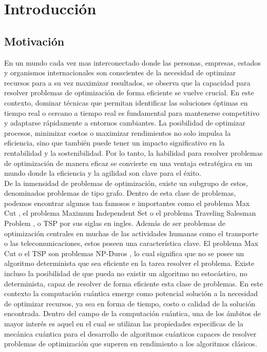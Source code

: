 \chapter{Introducción}

\section{Motivación}

En un mundo cada vez mas interconectado donde las personas, empresas, estados y organismos internacionales son conscientes de la necesidad de optimizar recursos para a su vez maximizar resultados, se observa que la capacidad para resolver problemas de optimización de forma eficiente se vuelve crucial. En este contexto, dominar técnicas que permitan identificar las soluciones óptimas en tiempo real o cercano a tiempo real es fundamental para mantenerse competitivo y adaptarse rápidamente a entornos cambiantes. La posibilidad de optimizar procesos, minimizar costos o maximizar rendimientos no solo impulsa la eficiencia, sino que también puede tener un impacto significativo en la rentabilidad y la sostenibilidad. Por lo tanto, la habilidad para resolver problemas de optimización de manera eficaz se convierte en una ventaja estratégica en un mundo donde la eficiencia y la agilidad son clave para el éxito. \\ 

De la inmensidad de problemas de optimización, existe un subgrupo de estos, denominados problemas de tipo grafo. Dentro de esta clase de problemas, podemos encontrar algunos tan famosos e importantes como el problema Max Cut \citep{yang}, el problema Maximum Independent Set \citep{heal} o el problema Traveling Salesman Problem \citep{bermejo}, o TSP por sus siglas en ingles. Además de ser problemas de optimización centrales en muchas de las actividades humanas como el transporte o las telecomunicaciones, estos poseen una característica clave. El problema Max Cut o el TSP son problemas NP-Duros \citep{hoerl}, lo cual significa que no se posee un algoritmo determinista que sea eficiente en la tarea resolver el problema. Existe incluso la posibilidad de que pueda no existir un algoritmo no estocástico, no determinista, capaz de resolver de forma eficiente esta clase de problemas. En este contexto la computación cuántica emerge como potencial solución a la necesidad de optimizar recursos, ya sea en forma de tiempo, costo o calidad de la solución encontrada. Dentro del campo de la computación cuántica, una de los ámbitos de mayor interés es aquel en el cual se utilizan las propiedades especificas de la mecánica cuántica para el desarrollo de algoritmos cuánticos capaces de resolver problemas de optimización que superen en rendimiento a los algoritmos clásicos.

